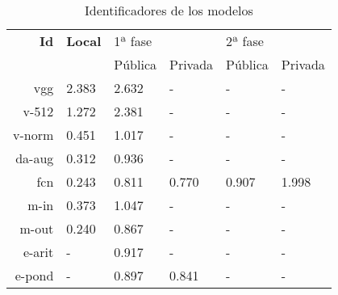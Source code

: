 \begin{table}[]
\centering
\caption{Identificadores de los modelos}
\label{final_scores}
\begin{tabular}{r|lllll}
\textbf{Id}           & \textbf{Local}        & 1ª fase                      &                              & 2ª fase                      &                              \\ \cline{3-6} 
\multicolumn{1}{l|}{} & \multicolumn{1}{l|}{} & \multicolumn{1}{l|}{Pública} & \multicolumn{1}{l|}{Privada} & \multicolumn{1}{l|}{Pública} & \multicolumn{1}{l|}{Privada} \\ \hline
vgg                   & 2.383                 & 2.632                        & -                            & -                            & -                            \\
v-512                 & 1.272                 & 2.381                        & -                            & -                            & -                            \\
v-norm                & 0.451                 & 1.017                        & -                            & -                            & -                            \\
da-aug                & 0.312                 & 0.936                        & -                            & -                            & -                            \\
fcn                   & 0.243                 & 0.811                        & 0.770                        & 0.907                        & 1.998                        \\
m-in                  & 0.373                 & 1.047                        & -                            & -                            & -                            \\
m-out                 & 0.240                 & 0.867                        & -                            & -                            & -                            \\
e-arit                & -                     & 0.917                        & -                            & -                            & -                            \\
e-pond                & -                     & 0.897                        & 0.841                        & -                            & -                           
\end{tabular}
\end{table}

